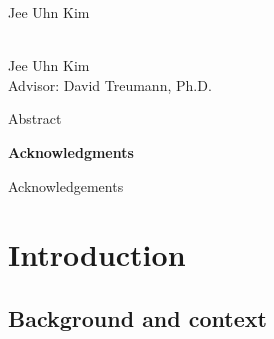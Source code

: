 \maketitle

\newpage

\thispagestyle{empty}
\begin{center}
\null
\vfill
{} Jee Uhn Kim
\end{center}

\newpage

\thispagestyle{empty}
\begin{center}
{\bf \thesistitle}\\
Jee Uhn Kim\\
Advisor: David Treumann, Ph.D.
\end{center}

Abstract

\frontmatter %

\thispagestyle{plain}
{}
\cfoot{\thepage}
\tableofcontents

\newpage

\thispagestyle{plain}
{}
\cfoot{\thepage}
\listoffigures

\newpage

\thispagestyle{plain}
{}
\cfoot{\thepage}
\vspace*{0.75in}
{\Large\textbf{Acknowledgments}}
\
\
\noindent

Acknowledgements

\newpage

\mainmatter %


\chapter{Introduction}\label{chapter_introduction}

\section{Background and context}\label{sec_background_and_context}

